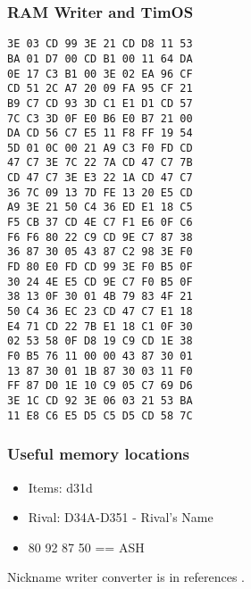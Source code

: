 \documentclass[../main.tex]{subfiles}
\begin{document}
    \subsubsection{RAM Writer and TimOS}
    \begin{verbatim}
3E 03 CD 99 3E 21 CD D8 11 53
BA 01 D7 00 CD B1 00 11 64 DA
0E 17 C3 B1 00 3E 02 EA 96 CF
CD 51 2C A7 20 09 FA 95 CF 21
B9 C7 CD 93 3D C1 E1 D1 CD 57
7C C3 3D 0F E0 B6 E0 B7 21 00 
DA CD 56 C7 E5 11 F8 FF 19 54 
5D 01 0C 00 21 A9 C3 F0 FD CD 
47 C7 3E 7C 22 7A CD 47 C7 7B 
CD 47 C7 3E E3 22 1A CD 47 C7
36 7C 09 13 7D FE 13 20 E5 CD 
A9 3E 21 50 C4 36 ED E1 18 C5 
F5 CB 37 CD 4E C7 F1 E6 0F C6 
F6 F6 80 22 C9 CD 9E C7 87 38 
36 87 30 05 43 87 C2 98 3E F0 
FD 80 E0 FD CD 99 3E F0 B5 0F 
30 24 4E E5 CD 9E C7 F0 B5 0F 
38 13 0F 30 01 4B 79 83 4F 21 
50 C4 36 EC 23 CD 47 C7 E1 18 
E4 71 CD 22 7B E1 18 C1 0F 30 
02 53 58 0F D8 19 C9 CD 1E 38 
F0 B5 76 11 00 00 43 87 30 01 
13 87 30 01 1B 87 30 03 11 F0 
FF 87 D0 1E 10 C9 05 C7 69 D6
3E 1C CD 92 3E 06 03 21 53 BA
11 E8 C6 E5 D5 C5 D5 CD 58 7C
    \end{verbatim}

    \subsubsection{Useful memory locations}
    \begin{itemize}
        \item Items: d31d
        \item Rival: D34A-D351 - Rival's Name
        \item 80 92 87 50 == ASH
    \end{itemize}

    Nickname writer converter is in references \cite{nameConverter}.
\end{document}
